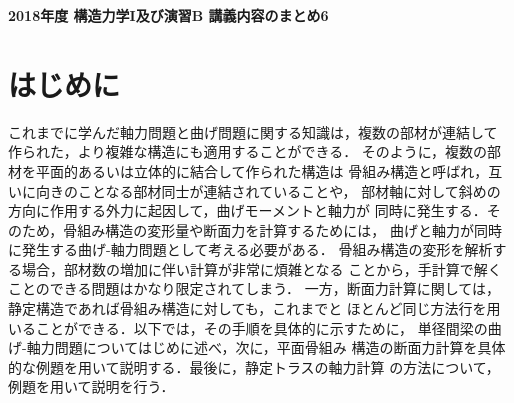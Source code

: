 \documentclass[10pt,a4j]{jarticle}
\newlength{\minitwocolumn}
\begin{document}
\newcommand{\fat}[1]{\mbox{\boldmath $#1$}}
\newcommand{\D}{\partial}
\newcommand{\w}{\omega}
\newcommand{\ga}{\alpha}
\newcommand{\gb}{\beta}
\newcommand{\gx}{\xi}
\newcommand{\gz}{\zeta}
\newcommand{\vhat}[1]{\hat{\fat{#1}}}
\newcommand{\spc}{\vspace{0.7\baselineskip}}
\newcommand{\halfspc}{\vspace{0.3\baselineskip}}

\newcommand{\twofig}[2]
 {
   \begin{figure}
     \begin{minipage}[t]{\minitwocolumn}
         \begin{center}   #1
         \end{center}
     \end{minipage}
         \hspace{\columnsep}
     \begin{minipage}[t]{\minitwocolumn}
         \begin{center} #2
         \end{center}
     \end{minipage}
   \end{figure}
 }
\begin{center}
	{\Large \bf 2018年度 構造力学I及び演習B 講義内容のまとめ6} \\
\end{center}
\section{はじめに}
これまでに学んだ軸力問題と曲げ問題に関する知識は，複数の部材が連結して
作られた，より複雑な構造にも適用することができる．
そのように，複数の部材を平面的あるいは立体的に結合して作られた構造は
骨組み構造と呼ばれ，互いに向きのことなる部材同士が連結されていることや，
部材軸に対して斜めの方向に作用する外力に起因して，曲げモーメントと軸力が
同時に発生する．そのため，骨組み構造の変形量や断面力を計算するためには，
曲げと軸力が同時に発生する曲げ-軸力問題として考える必要がある．
骨組み構造の変形を解析する場合，部材数の増加に伴い計算が非常に煩雑となる
ことから，手計算で解くことのできる問題はかなり限定されてしまう．
一方，断面力計算に関しては，静定構造であれば骨組み構造に対しても，これまでと
ほとんど同じ方法行を用いることができる．以下では，その手順を具体的に示すために，
単径間梁の曲げ-軸力問題についてはじめに述べ，次に，平面骨組み
構造の断面力計算を具体的な例題を用いて説明する．最後に，静定トラスの軸力計算
の方法について，例題を用いて説明を行う．
\end{document}
